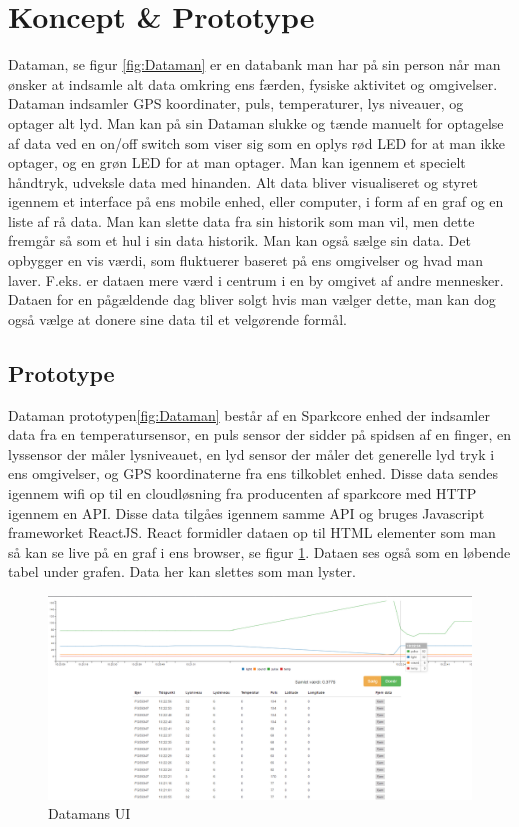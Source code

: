\section{Koncept \& Prototype}

Dataman, se figur \ref{fig:Dataman} er en databank man har på sin person når man ønsker at indsamle alt data omkring ens færden, fysiske aktivitet og omgivelser. Dataman indsamler GPS koordinater, puls, temperaturer, lys niveauer, og optager alt lyd. Man kan på sin Dataman slukke og tænde manuelt for optagelse af data ved en on/off switch som viser sig som en oplys rød LED for at man ikke optager, og en grøn LED for at man optager. 
Man kan igennem et specielt håndtryk, udveksle data med hinanden. 
Alt data bliver visualiseret og styret igennem et interface på ens mobile enhed, eller computer, i form af en graf og en liste af rå data. Man kan slette data fra sin historik som man vil, men dette fremgår så som et hul i sin data historik. 
Man kan også sælge sin data. Det opbygger en vis værdi, som fluktuerer baseret på ens omgivelser og hvad man laver. F.eks. er dataen mere værd i centrum i en by omgivet af andre mennesker. Dataen for en pågældende dag bliver solgt hvis man vælger dette, man kan dog også vælge at donere sine data til et velgørende formål. 


\subsection{Prototype}
Dataman prototypen\ref{fig:Dataman} består af en Sparkcore enhed der indsamler data fra en temperatursensor, en puls sensor der sidder på spidsen af en finger, en lyssensor der måler lysniveauet, en lyd sensor der måler det generelle lyd tryk i ens omgivelser, og GPS koordinaterne fra ens tilkoblet enhed. Disse data sendes igennem wifi op til en cloudløsning fra producenten af sparkcore med HTTP igennem en API. Disse data tilgåes igennem samme API og bruges Javascript frameworket ReactJS. React formidler dataen op til HTML elementer som man så kan se live på en graf i ens browser, se figur \ref{fig:ui}. Dataen ses også som en løbende tabel under grafen. Data her kan slettes som man lyster.

\begin{figure}
    \centering
    \includegraphics[width = \textwidth]{Pictures/datamanui.png}
    \caption{Datamans UI}
    \label{fig:ui}
\end{figure}

